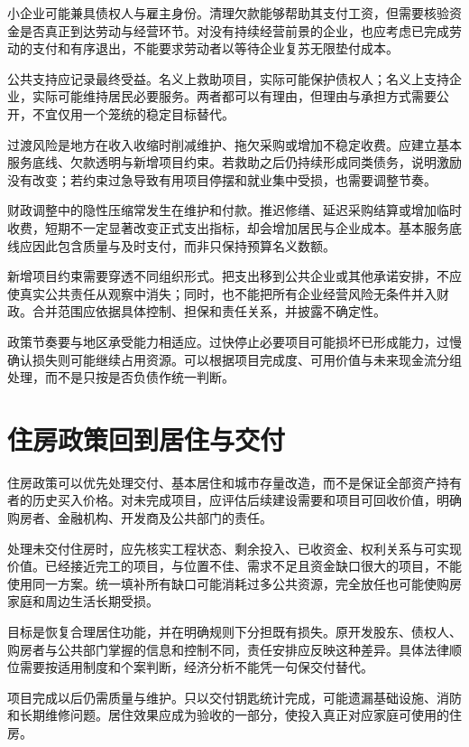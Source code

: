 \documentclass[UTF8,fontset=fandol,zihao=-4,oneside,openany]{ctexbook}
\begin{document}
小企业可能兼具债权人与雇主身份。清理欠款能够帮助其支付工资，但需要核验资金是否真正到达劳动与经营环节。对没有持续经营前景的企业，也应考虑已完成劳动的支付和有序退出，不能要求劳动者以等待企业复苏无限垫付成本。

公共支持应记录最终受益。名义上救助项目，实际可能保护债权人；名义上支持企业，实际可能维持居民必要服务。两者都可以有理由，但理由与承担方式需要公开，不宜仅用一个笼统的稳定目标替代。

过渡风险是地方在收入收缩时削减维护、拖欠采购或增加不稳定收费。应建立基本服务底线、欠款透明与新增项目约束。若救助之后仍持续形成同类债务，说明激励没有改变；若约束过急导致有用项目停摆和就业集中受损，也需要调整节奏。

\label{arg:P265}
财政调整中的隐性压缩常发生在维护和付款。推迟修缮、延迟采购结算或增加临时收费，短期不一定显著改变正式支出指标，却会增加居民与企业成本。基本服务底线应因此包含质量与及时支付，而非只保持预算名义数额。

新增项目约束需要穿透不同组织形式。把支出移到公共企业或其他承诺安排，不应使真实公共责任从观察中消失；同时，也不能把所有企业经营风险无条件并入财政。合并范围应依据具体控制、担保和责任关系，并披露不确定性。

政策节奏要与地区承受能力相适应。过快停止必要项目可能损坏已形成能力，过慢确认损失则可能继续占用资源。可以根据项目完成度、可用价值与未来现金流分组处理，而不是只按是否负债作统一判断。

\section{住房政策回到居住与交付}
住房政策可以优先处理交付、基本居住和城市存量改造，而不是保证全部资产持有者的历史买入价格。对未完成项目，应评估后续建设需要和项目可回收价值，明确购房者、金融机构、开发商及公共部门的责任。

\label{arg:P266}
处理未交付住房时，应先核实工程状态、剩余投入、已收资金、权利关系与可实现价值。已经接近完工的项目，与位置不佳、需求不足且资金缺口很大的项目，不能使用同一方案。统一填补所有缺口可能消耗过多公共资源，完全放任也可能使购房家庭和周边生活长期受损。

目标是恢复合理居住功能，并在明确规则下分担既有损失。原开发股东、债权人、购房者与公共部门掌握的信息和控制不同，责任安排应反映这种差异。具体法律顺位需要按适用制度和个案判断，经济分析不能凭一句保交付替代。

项目完成以后仍需质量与维护。只以交付钥匙统计完成，可能遗漏基础设施、消防和长期维修问题。居住效果应成为验收的一部分，使投入真正对应家庭可使用的住房。
\end{document}

